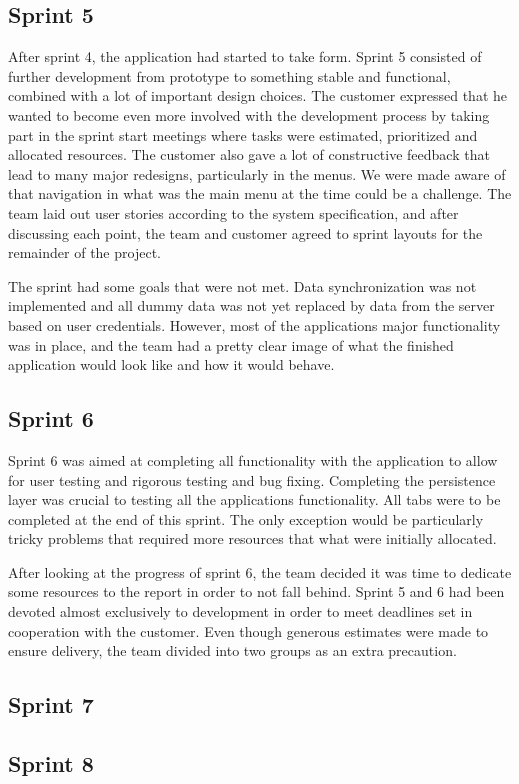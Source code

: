 \subsection{Sprint 5}
After sprint 4, the application had started to take form. Sprint 5 consisted of further development from prototype to something stable and functional, combined with a lot of important design choices. The customer expressed that he wanted to become even more involved with the development process by taking part in the sprint start meetings where tasks were estimated, prioritized and allocated resources. The customer also gave a lot of constructive feedback that lead to many major redesigns, particularly in the menus. We were made aware of that navigation in what was the main menu at the time could be a challenge. The team laid out user stories according to the system specification, and after discussing each point, the team and customer agreed to sprint layouts for the remainder of the project.

The sprint had some goals that were not met. Data synchronization was not implemented and all dummy data was not yet replaced by data from the server based on user credentials. However, most of the applications major functionality was in place, and the team had a pretty clear image of what the finished application would look like and how it would behave.

\subsection{Sprint 6}
Sprint 6 was aimed at completing all functionality with the application to allow for user testing and rigorous testing and bug fixing. Completing the persistence layer was crucial to testing all the applications functionality. All tabs were to be completed at the end of this sprint. The only exception would be particularly tricky problems that required more resources that what were initially allocated.

After looking at the progress of sprint 6, the team decided it was time to dedicate some resources to the report in order to not fall behind. Sprint 5 and 6 had been devoted almost exclusively to development in order to meet deadlines set in cooperation with the customer. Even though generous estimates were made to ensure delivery, the team divided into two groups as an extra precaution. 

\subsection{Sprint 7}

\subsection{Sprint 8}
